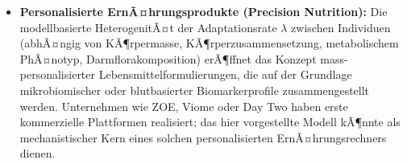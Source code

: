 ﻿\documentclass[12pt,a4paper]{article}
\theoremstyle{plain}
\theoremstyle{definition}
\theoremstyle{remark}
\begin{document}
\begin{itemize}
        RÃ¼ckmeldung geben, wann 50\,\% der SÃ¤ttigungskapazitÃ¤t erreicht
        ist. Die Digitalisierung des Halbmagen-Prinzips Ã¼ber
        Consumer-Technologie (vernetzte Waagen, KI-gestÃ¼tzte
        Bilderkennung von PortionsgrÃ¶ÃŸen) bietet ein erhebliches
        Marktpotenzial im Bereich \emph{Digital Nutrition}.
  \item \textbf{Personalisierte ErnÃ¤hrungsprodukte (Precision Nutrition):}
        Die modellbasierte HeterogenitÃ¤t der Adaptationsrate $\lambda$
        zwischen Individuen (abhÃ¤ngig von KÃ¶rpermasse, KÃ¶rperzusammensetzung,
        metabolischem PhÃ¤notyp, Darmflorakomposition) erÃ¶ffnet das
        Konzept mass-personalisierter Lebensmittelformulierungen, die
        auf der Grundlage mikrobiomischer oder blutbasierter
        Biomarkerprofile zusammengestellt werden. Unternehmen wie
        ZOE, Viome oder Day Two haben erste kommerzielle Plattformen
        realisiert; das hier vorgestellte Modell kÃ¶nnte als
        mechanistischer Kern eines solchen personalisierten
        ErnÃ¤hrungsrechners dienen.
\end{itemize}
\end{document}
